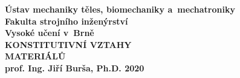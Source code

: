 \documentclass[a4paper, 12pt, oneside]{report}
\numberwithin{equation}{part}
\begin{document}
\begin{titlepage}
\pagecolor{fsimodra}
\color{white}
\centering
\bfseries
{Ústav mechaniky těles, biomechaniky a~mechatroniky\\Fakulta strojního inženýrství\\Vysoké učení v~Brně\\}
\vfill
{\Huge KONSTITUTIVNÍ VZTAHY\\MATERIÁLŮ\\}
\vfill
{\LARGE prof. Ing. Jiří Burša, Ph.D.}
\vfill
2020
\end{titlepage}

\clearpage
\color{black}
\tableofcontents
\clearpage
{}





\appendix

\end{document}
